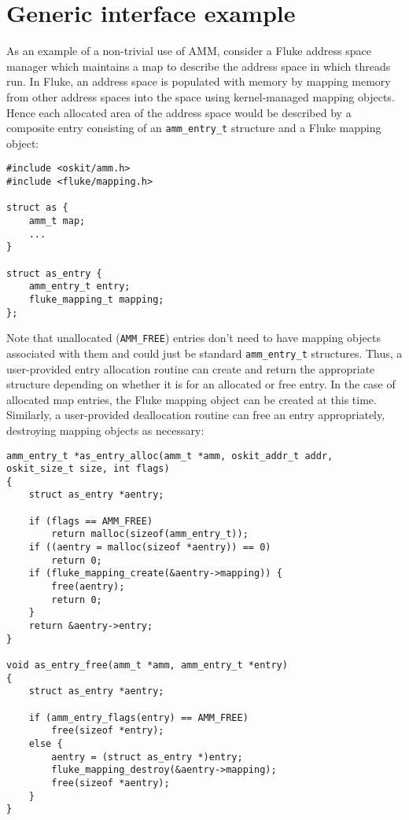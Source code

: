 \section{Generic interface example}

As an example of a non-trivial use of AMM,
consider a Fluke address space manager which maintains
a map to describe the address space in which threads run.
In Fluke,
an address space is populated with memory by mapping memory from other
address spaces into the space using kernel-managed mapping objects.
Hence each allocated area of the address space would be described by
a composite entry consisting of an {\tt amm_entry_t} structure and
a Fluke mapping object:
\begin{codefrag}
\footnotesize
\begin{verbatim}
#include <oskit/amm.h>
#include <fluke/mapping.h>

struct as {
    amm_t map;
    ...
}

struct as_entry {
    amm_entry_t entry;
    fluke_mapping_t mapping;
};
\end{verbatim}
\end{codefrag}

Note that
unallocated ({\tt AMM_FREE}) entries don't need to have mapping objects
associated with them and could just be standard {\tt amm_entry_t} structures.
Thus, a user-provided entry allocation routine can create and return the
appropriate structure depending on whether it is for an allocated or free
entry.
In the case of allocated map entries, the Fluke mapping object can be created
at this time.
Similarly, a user-provided deallocation routine can free an entry appropriately,
destroying mapping objects as necessary:
\begin{codefrag}
\footnotesize
\begin{verbatim}
amm_entry_t *as_entry_alloc(amm_t *amm, oskit_addr_t addr, oskit_size_t size, int flags)
{
    struct as_entry *aentry;

    if (flags == AMM_FREE)
        return malloc(sizeof(amm_entry_t));
    if ((aentry = malloc(sizeof *aentry)) == 0)
        return 0;
    if (fluke_mapping_create(&aentry->mapping)) {
        free(aentry);
        return 0;
    }
    return &aentry->entry;
}

void as_entry_free(amm_t *amm, amm_entry_t *entry)
{
    struct as_entry *aentry;

    if (amm_entry_flags(entry) == AMM_FREE)
        free(sizeof *entry);
    else {
        aentry = (struct as_entry *)entry;
        fluke_mapping_destroy(&aentry->mapping);
        free(sizeof *aentry);
    }
}
\end{verbatim}
\end{codefrag}

